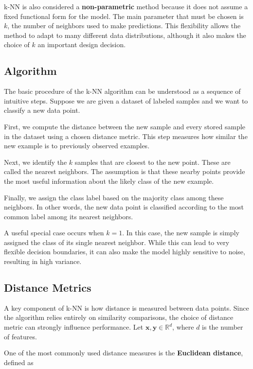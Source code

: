 \documentclass{article}
\begin{document}
k-NN is also considered a \textbf{non-parametric} method because it does not assume a fixed functional form for the model. The main parameter that must be chosen is \(k\), the number of neighbors used to make predictions. This flexibility allows the method to adapt to many different data distributions, although it also makes the choice of \(k\) an important design decision.

\subsection{Algorithm}

The basic procedure of the k-NN algorithm can be understood as a sequence of intuitive steps. Suppose we are given a dataset of labeled samples and we want to classify a new data point.

First, we compute the distance between the new sample and every stored sample in the dataset using a chosen distance metric. This step measures how similar the new example is to previously observed examples.

Next, we identify the \(k\) samples that are closest to the new point. These are called the nearest neighbors. The assumption is that these nearby points provide the most useful information about the likely class of the new example.

Finally, we assign the class label based on the majority class among these neighbors. In other words, the new data point is classified according to the most common label among its nearest neighbors.

A useful special case occurs when \(k=1\). In this case, the new sample is simply assigned the class of its single nearest neighbor. While this can lead to very flexible decision boundaries, it can also make the model highly sensitive to noise, resulting in high variance.

\subsection{Distance Metrics}

A key component of k-NN is how distance is measured between data points. Since the algorithm relies entirely on similarity comparisons, the choice of distance metric can strongly influence performance. Let $\mathbf{x}, \mathbf{y} \in \mathbb{R}^d$, where $d$ is the number of features.

One of the most commonly used distance measures is the \textbf{Euclidean distance}, defined as
\end{document}

